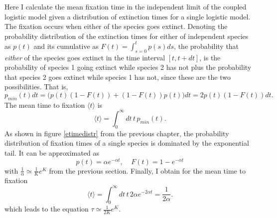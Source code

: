 Here I calculate the mean fixation time in the independent limit of the coupled logistic model given a distribution of extinction times for a single logistic model. The fixation occurs when either of the species goes extinct. 
Denoting the probability distribution of the extinction times for either of independent species as $p(t)$ and its cumulative as $F(t)=\int_{s=0}^t p(s)ds$, the probability that \emph{either} of the species goes extinct in the time interval $[t,t+dt]$, is the probability of species 1 going extinct while species 2 has not plus the probability that species 2 goes extinct while species 1 has not, since these are the two possibilities. 
That is,
\begin{equation}
p_{min}(t)dt = \bigg(p(t)\left(1-F(t)\right)+\left(1-F(t)\right)p(t)\bigg)dt = 2p(t)\left(1-F(t)\right)dt.
\end{equation}
The mean time to fixation $\langle t\rangle$ is 
\begin{equation}
\langle t\rangle = \int_0^\infty dt\, t\, p_{min}(t).
\end{equation}
As shown in figure \ref{etimedistr} from the previous chapter, the probability distribution of fixation times of a single species is dominated by the exponential tail. %
It can be approximated as
\begin{equation}
p(t) = \alpha e^{-\alpha t},\;\;\;\;  F(t) = 1 - e^{-\alpha t}
\end{equation}
with $\frac{1}{\alpha}\simeq \frac{1}{K}e^K$ from the previous section. %
Finally, I obtain for the mean time to fixation
\begin{equation}
\langle t\rangle = \int_0^\infty dt\, t\, 2\alpha e^{-2\alpha t} = \frac{1}{2\alpha}. \label{indietime}
\end{equation}
which leads to the equation $\tau \simeq \frac{1}{2K} e^K$. 


